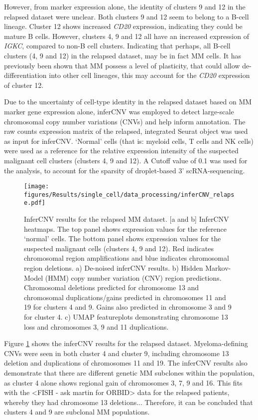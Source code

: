 However, from marker expression alone, the identity of clusters 9 and 12 in the relapsed dataset were unclear.
Both clusters 9 and 12 seem to belong to a B-cell lineage.
Cluster 12 shows increased \textit{CD20} expression, indicating they could be mature B cells.
However, clusters 4, 9 and 12 all have an increased expression of \textit{IGKC}, compared to non-B cell clusters.
Indicating that perhaps, all B-cell clusters (4, 9 and 12) in the relapsed dataset, may be in fact MM cells.
It has previously been shown that MM possess a level of plasticity, that could allow de-differentiation into other cell lineages\cite{kotouvcek2014myeloma}, this may account for the \textit{CD20} expression of cluster 12.

Due to the uncertainty of cell-type identity in the relapsed dataset based on MM marker gene expression alone, inferCNV\cite{patel2014single, infercnv2014} was employed to detect large-scale chromosomal copy number variations (CNVs) and help inform annotation.
The raw counts expression matrix of the relapsed, integrated Seurat object was used as input for inferCNV\@.
`Normal' cells (that is: myeloid cells, T cells and NK cells) were used as a reference for the relative expression intensity of the suspected malignant cell clusters (clusters 4, 9 and 12).
A Cutoff value of 0.1 was used for the analysis, to account for the sparsity of droplet-based 3' scRNA-sequencing.
%
\begin{figure}[htb]
    \centering
    \texttt{[image: figures/Results/single\_cell/data\_processing/inferCNV\_relapse.pdf]}
    \caption[inferCNV- relapsed MM]{InferCNV results for the relapsed MM dataset.
    [a and b] InferCNV heatmaps.
        The top panel shows expression values for the reference `normal' cells.
        The bottom panel shows expression values for the suspected malignant cells (clusters 4, 9 and 12).
        Red indicates chromosomal region amplifications and blue indicates chromosomal region deletions.
    a) De-noised inferCNV results.
    b) Hidden Markov-Model (HMM) copy number variation (CNV) region predictions.
        Chromosomal deletions predicted for chromosome 13 and chromosomal duplications/gains predicted in chromosomes 11 and 19 for clusters 4 and 9.
        Gains also predicted in chromosome 3 and 9 for cluster 4.
    c) UMAP featureplots demonstrating chromosome 13 loss and chromosomes 3, 9 and 11 duplications.
    }
    \label{fig:inferCNV_relapse}
\end{figure}
%
Figure \ref{fig:inferCNV_relapse} shows the inferCNV results for the relapsed dataset.
Myeloma-defining CNVs were seen in both cluster 4 and cluster 9, including chromosome 13 deletion and duplications of chromosomes 11 and 19.
The inferCNV results also demonstrate that there are different genetic MM subclones within the population, as cluster 4 alone shows regional gain of chromosomes 3, 7, 9 and 16.
This fits with the <FISH - ask martin for ORBID> data for the relapsed patients, whereby they had chromosome 13 deletions...
Therefore, it can be concluded that clusters 4 and 9 are subclonal MM populations.


